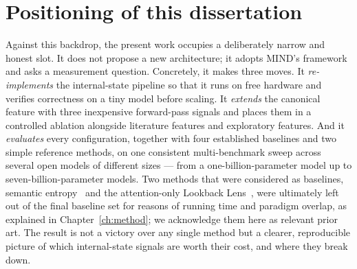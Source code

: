 \section{Positioning of this dissertation}

Against this backdrop, the present work occupies a deliberately narrow and honest slot.
It does not propose a new architecture; it adopts MIND's framework and asks a measurement
question. Concretely, it makes three moves. It \emph{re-implements} the internal-state
pipeline so that it runs on free hardware and verifies correctness on a tiny model before
scaling. It \emph{extends} the canonical feature with three inexpensive forward-pass
signals and places them in a controlled ablation alongside literature features and
exploratory features. And it \emph{evaluates} every configuration, together with four
established baselines and two simple reference methods, on one consistent multi-benchmark
sweep across several open models of different sizes --- from a one-billion-parameter model
up to seven-billion-parameter models. Two methods that were considered as baselines,
semantic entropy~\cite{kuhn2023semantic} and the attention-only Lookback
Lens~\cite{chuang2024lookback}, were ultimately left out of the final baseline set for
reasons of running time and paradigm overlap, as explained in Chapter~\ref{ch:method};
we acknowledge them here as relevant prior art. The result is not a victory over any
single method but a clearer, reproducible picture of which internal-state signals are
worth their cost, and where they break down.
